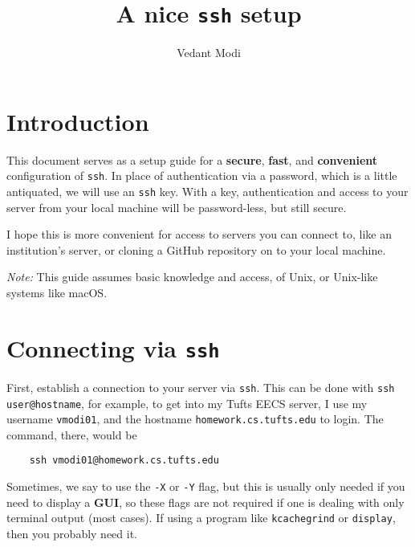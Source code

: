 \documentclass[12pt]{article}
\title{A nice \texttt{ssh} setup}
\author{Vedant Modi}
\date{ }
\begin{document}
\maketitle
\tableofcontents

\vspace{0.5\baselineskip}

\section{Introduction}

This document serves as a setup guide for a \textbf{secure}, \textbf{fast}, and
\textbf{convenient} configuration of \texttt{ssh}. In place of authentication
via a password, which is a little antiquated, we will use an \texttt{ssh} key.
With a key, authentication and access to your server from your local machine
will be password-less, but still secure. 

\vspace{0.5\baselineskip}

I hope this is more convenient for access to servers you can connect to, like
an institution's server, or cloning a GitHub repository on to your local
machine.

\vspace{0.5\baselineskip}

\textit{Note:} This guide assumes basic knowledge and access, of Unix, or Unix-like systems
like macOS.

\section{Connecting via \texttt{ssh}}
\vspace{1\baselineskip}

First, establish a connection to your server via \texttt{ssh}. This can be done
with \verb|ssh user@hostname|, for example, to get into my Tufts EECS server, I
use my username \verb|vmodi01|, and the hostname \verb|homework.cs.tufts.edu|
to login. The command, there, would be \begin{verbatim}
    ssh vmodi01@homework.cs.tufts.edu
\end{verbatim}

Sometimes, we say to use the \texttt{-X} or \texttt{-Y} flag, but this is
usually only needed if you need to display a \textbf{GUI}, 
so these flags are not required if one is dealing with only terminal output
(most cases). If using a program like \texttt{kcachegrind} or \texttt{display},
then you probably need it.
\end{document}
